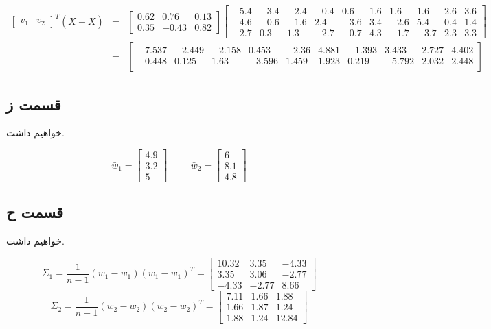 \documentclass{article}
\begin{document}
\begin{eqnarray*}
    \begin{bmatrix}v_1& v_2\end{bmatrix}^T (X - \bar{X}) & = & \begin{bmatrix}0.62& 0.76& 0.13\\ 0.35& -0.43& 0.82\end{bmatrix} \begin{bmatrix}-5.4 & -3.4 & -2.4 & -0.4 & 0.6 & 1.6 & 1.6 & 1.6 & 2.6 & 3.6 \\ -4.6 & -0.6 & -1.6 & 2.4 & -3.6 & 3.4 & -2.6 & 5.4 & 0.4 & 1.4 \\ -2.7 & 0.3 & 1.3 & -2.7 & -0.7 & 4.3 & -1.7 & -3.7 & 2.3 & 3.3\end{bmatrix}\\
    & = & \begin{bmatrix}-7.537 & -2.449 & -2.158 & 0.453 & -2.36 &  4.881 & -1.393 & 3.433 & 2.727 & 4.402\\ -0.448 & 0.125 & 1.63 & -3.596 & 1.459 & 1.923 & 0.219 & -5.792 & 2.032 & 2.448 \\\end{bmatrix}
\end{eqnarray*}

\subsection*{قسمت ز}

خواهیم داشت.

$$\bar{w}_1 = \begin{bmatrix}4.9\\ 3.2\\ 5\end{bmatrix} \hspace{1cm} \bar{w}_2 = \begin{bmatrix}6\\ 8.1\\ 4.8\end{bmatrix}$$

\subsection*{قسمت ح}

خواهیم داشت.

$$\Sigma_1 = \frac{1}{n-1} (w_1 - \bar{w}_1) (w_1 - \bar{w}_1)^T = \begin{bmatrix}10.32 & 3.35 & -4.33\\ 3.35 & 3.06 & -2.77\\-4.33 & -2.77 & 8.66\end{bmatrix}$$
$$\Sigma_2 = \frac{1}{n-1} (w_2 - \bar{w}_2) (w_2 - \bar{w}_2)^T = \begin{bmatrix}7.11 & 1.66 & 1.88\\ 1.66 & 1.87 & 1.24\\ 1.88 & 1.24 & 12.84\end{bmatrix}$$
\end{document}
